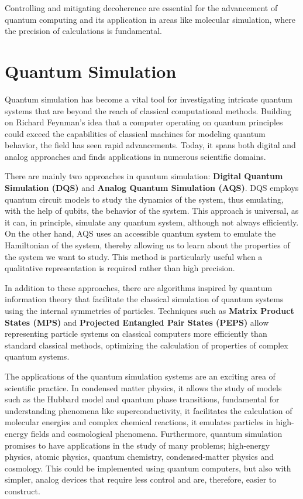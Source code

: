 Controlling and mitigating decoherence are essential for the advancement of quantum computing and its application in areas like molecular simulation, where the precision of calculations is fundamental.


\section{Quantum Simulation}

Quantum simulation has become a vital tool for investigating intricate quantum systems that are beyond the reach of classical computational methods. Building on Richard Feynman’s idea that a computer operating on quantum principles could exceed the capabilities of classical machines for modeling quantum behavior, the field has seen rapid advancements. Today, it spans both digital and analog approaches and finds applications in numerous scientific domains.

There are mainly two approaches in quantum simulation: \textbf{Digital Quantum Simulation (DQS)} and \textbf{Analog Quantum Simulation (AQS)}. DQS employs quantum circuit models to study the dynamics of the system, thus emulating, with the help of qubits, the behavior of the system. This approach is universal, as it can, in principle, simulate any quantum system, although not always efficiently. On the other hand, AQS uses an accessible quantum system to emulate the Hamiltonian of the system, thereby allowing us to learn about the properties of the system we want to study. This method is particularly useful when a qualitative representation is required rather than high precision.\cite{AQS}

In addition to these approaches, there are algorithms inspired by quantum information theory that facilitate the classical simulation of quantum systems using the internal symmetries of particles. Techniques such as \textbf{Matrix Product States (MPS)} and \textbf{Projected Entangled Pair States (PEPS)} allow representing particle systems on classical computers more efficiently than standard classical methods, optimizing the calculation of properties of complex quantum systems.
\cite{mps_peps_tensor_networks}

The applications of the quantum simulation systems are an exciting area of scientific practice. In condensed matter physics, it allows the study of models such as the Hubbard model and quantum phase transitions, fundamental for understanding phenomena like superconductivity, it facilitates the calculation of molecular energies and complex chemical reactions, it emulates particles in high-energy fields and cosmological phenomena. Furthermore, quantum simulation promises to have applications in the study of many problems; high-energy physics, atomic physics, quantum chemistry, condensed-matter physics and cosmology. This could be implemented using quantum computers, but also with
simpler, analog devices that require less control and are, therefore, easier to construct.\cite{QuantumSimulation}

